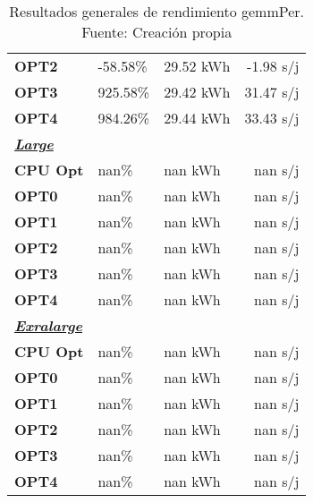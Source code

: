 \begin{table}[H]
\begin{tabular}{lllr}
    \cellcolor[HTML]{DAE8FC} \textbf{OPT2} & -58.58\%  &	29.52 kWh  &	-1.98 s/j \\
    \rowcolor[HTML]{EFEFEF} \cellcolor[HTML]{DAE8FC} \textbf{OPT3} &925.58\%  &	29.42 kWh  &	31.47 s/j \\
    \cellcolor[HTML]{DAE8FC} \textbf{OPT4} & 984.26\%  &	29.44 kWh  &	33.43 s/j \\
    \rowcolor[HTML]{EFEFEF} \cellcolor[HTML]{DAE8FC} \textbf{\textbf{{\emph{{\underline{{Large}}}}}}} &&	&	 \\
    \cellcolor[HTML]{DAE8FC} \textbf{CPU Opt} & nan\%  &	nan kWh  &	nan s/j \\
    \rowcolor[HTML]{EFEFEF} \cellcolor[HTML]{DAE8FC} \textbf{OPT0} &nan\%  &	nan kWh  &	nan s/j \\
    \cellcolor[HTML]{DAE8FC} \textbf{OPT1} & nan\%  &	nan kWh  &	nan s/j \\
    \rowcolor[HTML]{EFEFEF} \cellcolor[HTML]{DAE8FC} \textbf{OPT2} &nan\%  &	nan kWh  &	nan s/j \\
    \cellcolor[HTML]{DAE8FC} \textbf{OPT3} & nan\%  &	nan kWh  &	nan s/j \\
    \rowcolor[HTML]{EFEFEF} \cellcolor[HTML]{DAE8FC} \textbf{OPT4} &nan\%  &	nan kWh  &	nan s/j \\
    \cellcolor[HTML]{DAE8FC} \textbf{\textbf{{\emph{{\underline{{Exralarge}}}}}}} & &	&	 \\
    \rowcolor[HTML]{EFEFEF} \cellcolor[HTML]{DAE8FC} \textbf{CPU Opt} &nan\%  &	nan kWh  &	nan s/j \\
    \cellcolor[HTML]{DAE8FC} \textbf{OPT0} & nan\%  &	nan kWh  &	nan s/j \\
    \rowcolor[HTML]{EFEFEF} \cellcolor[HTML]{DAE8FC} \textbf{OPT1} &nan\%  &	nan kWh  &	nan s/j \\
    \cellcolor[HTML]{DAE8FC} \textbf{OPT2} & nan\%  &	nan kWh  &	nan s/j \\
    \rowcolor[HTML]{EFEFEF} \cellcolor[HTML]{DAE8FC} \textbf{OPT3} &nan\%  &	nan kWh  &	nan s/j \\
    \cellcolor[HTML]{DAE8FC} \textbf{OPT4} & nan\%  &	nan kWh  &	nan s/j \\
    \end{tabular}
    \caption[Resultados generales de rendimiento gemmPer]{{Resultados generales de rendimiento gemmPer. Fuente: Creación propia}}
    \label{table_global_gemmPer_PowerResults_speedup-energy}
\end{table}